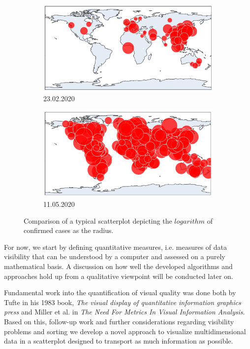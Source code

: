 \documentclass[a4paper,11pt]{article}
\begin{document}
%
\begin{figure}[h]
  \begin{subfigure}{0.5\textwidth}
    \includegraphics[width=0.9\linewidth]{covid_spread_20200223.png}
    \caption{23.02.2020}\label{fig:covid2020Feb}
  \end{subfigure}
  \begin{subfigure}{0.5\textwidth}
    \includegraphics[width=0.9\linewidth]{covid_spread_20200511.png}
    \caption{11.05.2020}\label{fig:covid2020May}
  \end{subfigure}
  \caption{Comparison of a typical scatterplot depicting the $logarithm$ of confirmed cases as the radius.}
  \label{fig:covid19}
\end{figure}
%

For now, we start by defining quantitative measures, i.e. measures of data visibility that can be understood by a computer and assessed on a purely mathematical basis. A discussion on how well the developed algorithms and approaches hold up from a qualitative viewpoint will be conducted later on.

Fundamental work into the quantification of visual quality was done both by Tufte in his 1983 book, \textit{The visual display of quantitative information graphics press} and Miller et al. in \textit{The Need For Metrics In Visual Information Analysis}. Based on this, follow-up work and further considerations regarding visibility problems and sorting we develop a novel approach to visualize multidimensional data in a scatterplot designed to transport as much information as possible.
\end{document}

